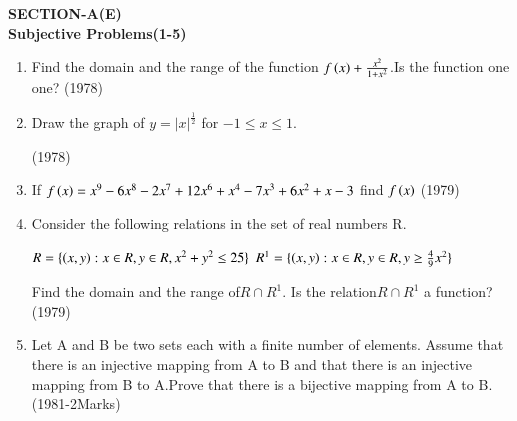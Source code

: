 \documentclass[journal,12pt,twocolumn]{IEEEtran}
\theoremstyle{remark}
\begin{document}
\begin{center}
    \item 
      \textbf{SECTION-A(E)\\Subjective Problems(1-5)}
\end{center}
\begin{enumerate}[start=1]
\item Find the domain and the range of the function $f\left(x\right)+\frac{x^2}{1+x^2}$.Is the function one one? 
\hfill(1978)
\item Draw the graph of $y=|x|^{\frac{1}{2}}$ for $-1\le x \le1.$

\hfill(1978)
\item If $f\left(x\right)=x^9-6x^8-2x^7+12x^6+x^4-7x^3+6x^2+x-3$ find $f\left(x\right)$
\hfill(1979)
\item Consider the following relations in the set of real numbers R.

$R=\{\left(x,y\right):x\in R,y\in R,x^2+y^2\le25\}$
$R^1=\{\left(x,y\right):x\in R,y\in R,y\ge\frac{4}{9}x^2\}$

Find the domain and the range of$ R\cap R^1.$ Is the relation$ R\cap R^1$ a function? 
\hfill(1979)
\item Let A and B be two sets each with a finite number of elements. Assume that there is an injective mapping from A to B and that there is an injective mapping from B to A.Prove that there is a bijective mapping from A to B.
\hfill(1981-2Marks)
\end{enumerate}
\end{document}
